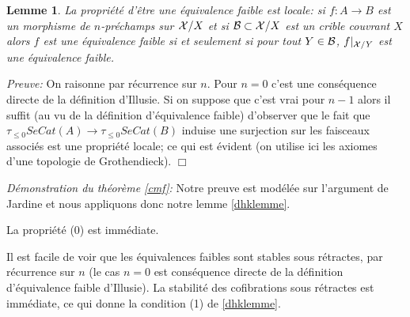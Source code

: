 \documentclass[12pt]{article}
\newcommand{\eop}{\hfill $\Box$\vspace{.1in}}
\newtheorem{lemme}[lemma]{Lemme}
\newcommand{\Bb}{{\cal B}}
\newcommand{\Xx}{{\cal X}}
\begin{document}
\begin{lemme}
\label{locale}
La propri\'et\'e d'\^etre une \'equivalence faible est locale: si
$f:A\rightarrow
B$ est un morphisme de $n$-pr\'echamps sur $\Xx /X$ et si $\Bb \subset
\Xx /X$
est un crible couvrant $X$
alors $f$ est une \'equivalence faible si et seulement si pour tout $Y\in
\Bb$, $f|_{\Xx /Y}$ est une \'equivalence faible.
\end{lemme}
{\em Preuve:}
On raisonne par r\'ecurrence sur $n$. Pour $n=0$ c'est une cons\'equence
directe de la d\'efinition d'Illusie. Si on suppose que c'est vrai pour $n-1$
alors il suffit (au vu de la d\'efinition d'\'equivalence faible) d'observer
que le fait que $\tau _{\leq 0}SeCat(A)\rightarrow \tau
_{\leq 0} SeCat(B)$ induise
une surjection sur les faisceaux associ\'es est une propri\'et\'e locale;
ce qui est \'evident
(on utilise ici les axiomes d'une topologie de Grothendieck).
\eop



{\em D\'emonstration du th\'eor\`eme \ref{cmf}:}
Notre preuve est mod\'el\'ee sur l'argument de Jardine \cite{Jardine}
et nous appliquons donc
notre lemme \ref{dhklemme}.

La propri\'et\'e (0) est imm\'ediate.

Il est facile de voir que les \'equivalences faibles sont stables sous
r\'etractes, par r\'e\-cur\-ren\-ce sur $n$ (le cas $n=0$ est
cons\'equence directe de la d\'efinition d'\'equivalence faible d'Illusie).
La stabilit\'e des cofibrations sous r\'etractes est imm\'ediate, ce qui donne
la condition (1) de
\ref{dhklemme}.
\end{document}
